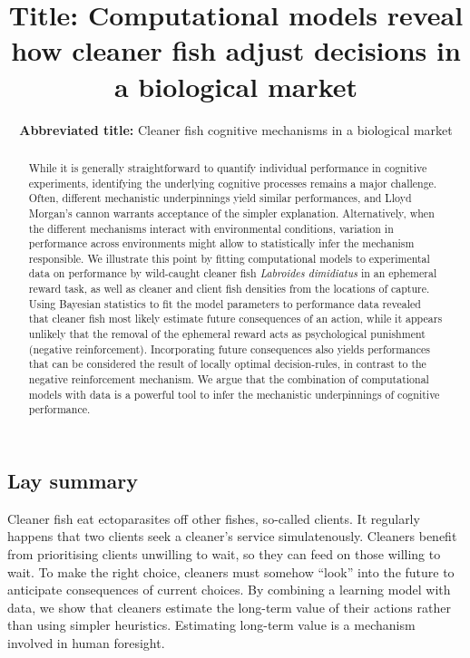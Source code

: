 \documentclass[
  12pt,
]{article}
\title{\large \textbf{Title:} Computational models reveal how cleaner
fish adjust decisions in a biological market}
\subtitle{\normalsize \textbf{Abbreviated title:} Cleaner fish cognitive
mechanisms in a biological market}
\date{}
\begin{document}
\maketitle
\begin{flushleft}
\end{flushleft}
\begin{abstract}
While it is generally straightforward to quantify individual performance
in cognitive experiments, identifying the underlying cognitive processes
remains a major challenge. Often, different mechanistic underpinnings
yield similar performances, and Lloyd Morgan's cannon warrants
acceptance of the simpler explanation. Alternatively, when the different
mechanisms interact with environmental conditions, variation in
performance across environments might allow to statistically infer the
mechanism responsible. We illustrate this point by fitting computational
models to experimental data on performance by wild-caught cleaner fish
\emph{Labroides dimidiatus} in an ephemeral reward task, as well as
cleaner and client fish densities from the locations of capture. Using
Bayesian statistics to fit the model parameters to performance data
revealed that cleaner fish most likely estimate future consequences of
an action, while it appears unlikely that the removal of the ephemeral
reward acts as psychological punishment (negative reinforcement).
Incorporating future consequences also yields performances that can be
considered the result of locally optimal decision-rules, in contrast to
the negative reinforcement mechanism. We argue that the combination of
computational models with data is a powerful tool to infer the
mechanistic underpinnings of cognitive performance.
\end{abstract}
\subsection*{Lay summary}
Cleaner fish eat ectoparasites off other fishes, so-called clients. It
regularly happens that two clients seek a cleaner's service
simulatenously. Cleaners benefit from prioritising clients unwilling to
wait, so they can feed on those willing to wait. To make the right
choice, cleaners must somehow ``look'' into the future to anticipate
consequences of current choices. By combining a learning model with
data, we show that cleaners estimate the long-term value of their
actions rather than using simpler heuristics. Estimating long-term value
is a mechanism involved in human foresight.


\newpage
\end{document}
